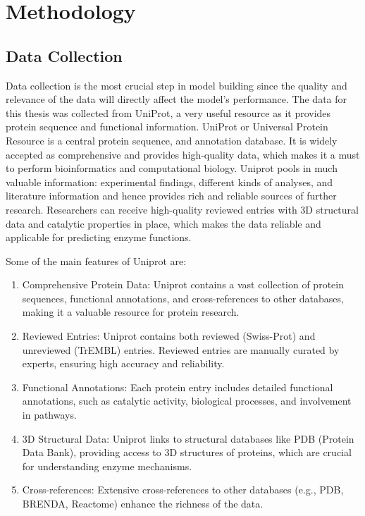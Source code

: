 \section{Methodology}

\subsection{Data Collection}
\label{sec:Data Collection}

Data collection is the most crucial step in model building since the quality and relevance of the data will directly affect the model's performance. The data for this thesis was collected from UniProt, a very useful resource as it provides protein sequence and functional information. UniProt or Universal Protein Resource is a central protein sequence, and annotation database. It is widely accepted as comprehensive and provides high-quality data, which makes it a must to perform bioinformatics and computational biology. Uniprot pools in much valuable information: experimental findings, different kinds of analyses, and literature information and hence provides rich and reliable sources of further research. Researchers can receive high-quality reviewed entries with 3D structural data and catalytic properties in place, which makes the data reliable and applicable for predicting enzyme functions. \autocite{uniprotconsortiumUniProtUniversalProtein2021}

Some of the main features of Uniprot are:

\begin{enumerate}
    \item Comprehensive Protein Data: Uniprot contains a vast collection of protein sequences, functional annotations, and cross-references to other databases, making it a valuable resource for protein research.
    \item Reviewed Entries: Uniprot contains both reviewed (Swiss-Prot) and unreviewed (TrEMBL) entries. Reviewed entries are manually curated by experts, ensuring high accuracy and reliability.
    \item Functional Annotations: Each protein entry includes detailed functional annotations, such as catalytic activity, biological processes, and involvement in pathways.
    \item 3D Structural Data: Uniprot links to structural databases like PDB (Protein Data Bank), providing access to 3D structures of proteins, which are crucial for understanding enzyme mechanisms.
    \item Cross-references: Extensive cross-references to other databases (e.g., PDB, BRENDA, Reactome) enhance the richness of the data.
\end{enumerate}

